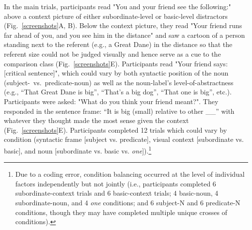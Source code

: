 \documentclass[10pt,letterpaper]{article}
\newcommand{\pt}[1]{\textcolor{Purple}{[pt: #1]}}
\begin{document}
In the main trials, participants read "You and your friend see the following:" above a context picture of either subordinate-level or basic-level distractors (Fig.~\ref{screenshots}A, B). 
Below the context picture, they read "Your friend runs far ahead of you, and you see him in the distance" and saw a cartoon of a person standing next to the referent (e.g., a Great Dane) in the distance so that the referent size could not be judged visually and hence serve as a cue to the comparison class (Fig.~\ref{screenshots}E). 
Participants read "Your friend says: [critical sentence]", which could vary by both syntactic position of the noun (subject-~vs.~predicate-noun) as well as the noun-label's level-of-abstractness (e.g., ``That Great Dane is big'', ``That's a big dog'', ``That one is big'', etc.). 
Participants were asked: "What do you think your friend meant?". 
They responded in the sentence frame: “It is big (small) relative to other \_\_” with whatever they thought made the most sense given the context (Fig.~\ref{screenshots}E).
Participants completed 12 trials which could vary by condition (syntactic frame [subject vs. predicate], visual context [subordinate vs. basic], and noun [subordinate vs. basic vs. \emph{one}]).\footnote{Due to a coding error, condition balancing occurred at the level of individual factors independently but not jointly (i.e., participants completed 6 subordinate-context trials and 6 basic-context trials; 4 basic-noun, 4 subordinate-noun, and 4 \emph{one} conditions; and 6 subject-N and 6 predicate-N conditions, though they may have completed multiple unique crosses of conditions).}
\end{document}
